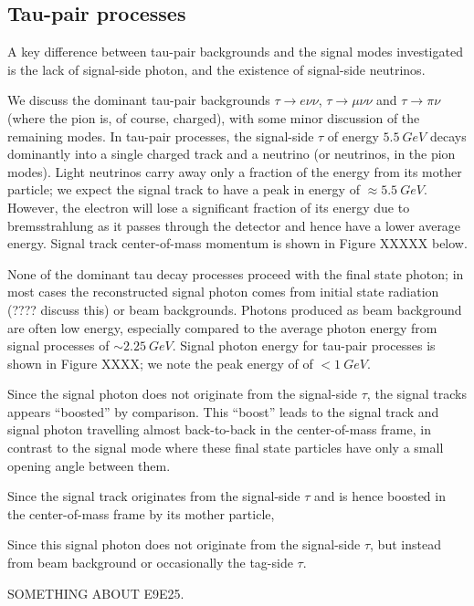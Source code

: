 \documentclass[12pt]{thesis}  %
\begin{document}
\subsection{Tau-pair processes}

A key difference between tau-pair backgrounds and the signal modes investigated is the lack of signal-side photon, and the existence of signal-side neutrinos.

We discuss the dominant tau-pair backgrounds $\tau\to e\nu\nu$, $\tau\to\mu\nu\nu$ and $\tau\to\pi\nu$ (where the pion is, of course, charged), with some minor discussion of the remaining modes. In tau-pair processes, the signal-side $\tau$ of energy $\SI{5.5}{GeV}$ decays dominantly into a single charged track and a neutrino (or neutrinos, in the pion modes). Light neutrinos carry away only a fraction of the energy from its mother particle; we expect the signal track to have a peak in energy of $\approx\SI{5.5}{GeV}$. However, the electron will lose a significant fraction of its energy due to bremsstrahlung as it passes through the detector and hence have a lower average energy. Signal track center-of-mass momentum is shown in Figure XXXXX below.

None of the dominant tau decay processes proceed with the final state photon; in most cases the reconstructed signal photon comes from initial state radiation (???? discuss this) or beam backgrounds. Photons produced as beam background are often low energy, especially compared to the average photon energy from signal processes of $\sim \SI{2.25}{GeV}$. Signal photon energy for tau-pair processes is shown in Figure XXXX; we note the peak energy of of $<\SI{1}{GeV}$. 

Since the signal photon does not originate from the signal-side $\tau$, the signal tracks appears ``boosted'' by comparison. This ``boost'' leads to the signal track and signal photon travelling almost back-to-back in the center-of-mass frame, in contrast to the signal mode where these final state particles have only a small opening angle between them.  


Since the signal track originates from the signal-side $\tau$ and is hence boosted in the center-of-mass frame by its mother particle,

Since this signal photon does not originate from the signal-side $\tau$, but instead from beam background or occasionally the tag-side $\tau$.

SOMETHING ABOUT E9E25.
\end{document}
